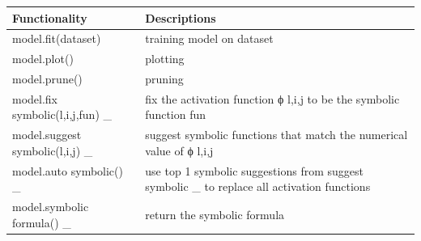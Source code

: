 \begin{tabular}{ll}
\toprule
Functionality & Descriptions \\
\midrule
model.fit(dataset) & training model on dataset \\
model.plot() & plotting \\
model.prune() & pruning \\
model.fix symbolic(l,i,j,fun) \_ & fix the activation function ϕ l,i,j to be the symbolic function fun \\
model.suggest symbolic(l,i,j) \_ & suggest symbolic functions that match the numerical value of ϕ l,i,j \\
model.auto symbolic() \_ & use top 1 symbolic suggestions from suggest symbolic \_ to replace all activation functions \\
model.symbolic formula() \_ & return the symbolic formula \\
\bottomrule
\end{tabular}
